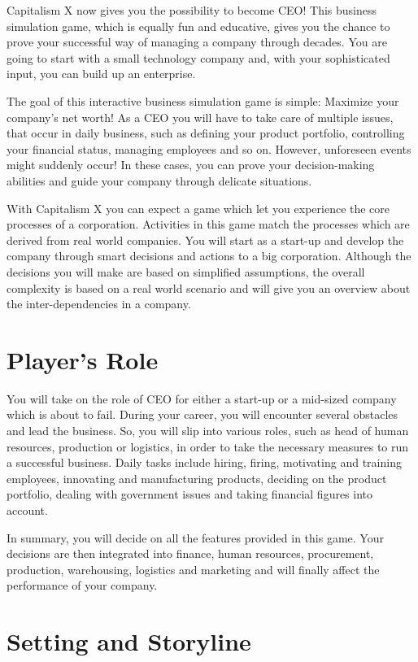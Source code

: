 \documentclass[11pt,titlepage,oneside,openany]{book}
\begin{document}
Capitalism X now gives you the possibility to become CEO! This business simulation game, which is equally fun and educative, gives you the chance to prove your successful way of managing a company through decades. You are going to start with a small technology company and, with your sophisticated input, you can build up an enterprise.

The goal of this interactive business simulation game is simple: Maximize your company's net worth! As a CEO you will have to take care of multiple issues, that occur in daily business, such as defining your product portfolio, controlling your financial status, managing employees and so on. However, unforeseen events might suddenly occur! In these cases, you can prove your decision-making abilities and guide your company through delicate situations. 

With Capitalism X you can expect a game which let you experience the core processes of a corporation. Activities in this game match the processes which are derived from real world companies. You will start as a start-up and develop the company through smart decisions and actions to a big corporation. Although the decisions you will make are based on simplified assumptions, the overall complexity is based on a real world scenario and will give you an overview about the inter-dependencies in a company.
 
\section{Player's Role}
You will take on the role of CEO for either a start-up or a mid-sized company which is about to fail. During your career, you will encounter several obstacles and lead the business. So, you will slip into various roles, such as head of human resources, production or logistics, in order to take the necessary measures to run a successful business. Daily tasks include hiring, firing, motivating and training employees, innovating and manufacturing products, deciding on the product portfolio, dealing with government issues and taking financial figures into account. 

In summary, you will decide on all the features provided in this game. Your decisions are then integrated into finance, human resources, procurement, production, warehousing, logistics and marketing and will finally affect the performance of your company.

\section{Setting and Storyline}
\label{SettingStory}
\end{document}
